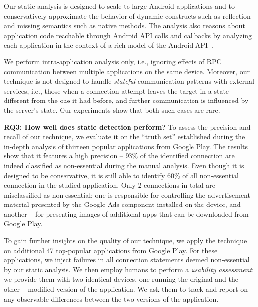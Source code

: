 
Our static analysis is designed to scale to large Android applications
and to conservatively approximate the behavior of dynamic constructs
such as reflection and missing semantics such as native methods.  The
analysis also reasons about application code reachable through Android
API calls and callbacks by analyzing each application in the context
of a rich model of the Android
API~\cite{Gordon:Kim:Perkins:Gilham:Nguyen:Rinard:NDSS15}. 

We perform intra-application analysis only, i.e., ignoring effects of RPC communication between multiple applications on the same device. Moreover, our technique is not designed to handle
\emph{stateful} communication patterns with external services, i.e., those when a connection attempt leaves the target in a state different from the one it had before, and further communication is influenced by the server's state. Our experiments show that both such cases are rare. 

\noindent 
{\bf RQ3: How well does static detection perform?}
To assess the precision and recall of our technique, we evaluate it on the ``truth set'' established during the in-depth analysis of thirteen popular applications from Google Play.
The results show that it features a high precision -- 93\% of the identified connection are indeed classified as non-essential during the manual analysis. Even though it is designed to be conservative, it is still able to identify  60\% of all non-essential connection in the studied application.
Only 2 connections in total are misclassified as non-essential: one is responsible for controlling the advertisement material presented by the Google Ads component installed on the device, and another -- for presenting images of additional apps that can be downloaded from Google Play. 

To gain further insights on the quality of our technique, we apply the technique on additional 47 top-popular applications from Google Play. For these applications, we inject failures in all connection statements deemed non-essential by our static analysis. We then employ humans to perform a \emph{usability assessment}: we provide them with two identical devices, one running the original and the other -- modified version of the application. We ask them to track and report on any observable differences between the two versions of the application. 

